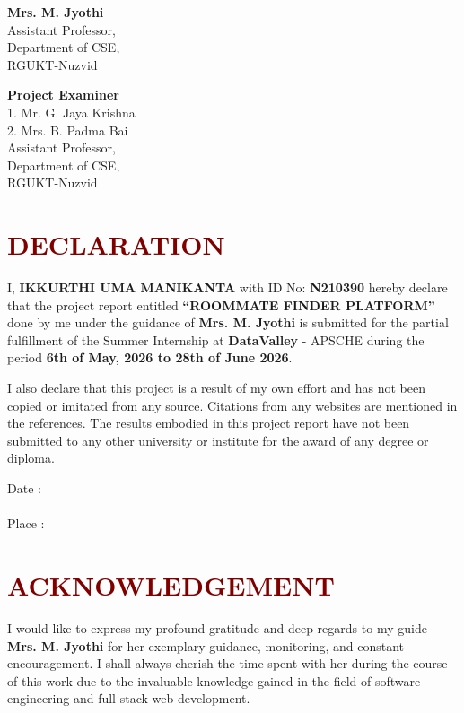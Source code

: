 \documentclass[12pt,a4paper]{report}
\begin{document}
\vspace{3cm}
\noindent
\begin{minipage}{0.5\textwidth}
\textbf{Mrs. M. Jyothi} \\
Assistant Professor, \\
Department of CSE, \\
RGUKT-Nuzvid
\end{minipage}%
\hfill
\begin{minipage}{0.45\textwidth}
\begin{flushright}
\textbf{Project Examiner} \\
1. Mr. G. Jaya Krishna \\
2. Mrs. B. Padma Bai \\
Assistant Professor, \\
Department of CSE, \\
RGUKT-Nuzvid
\end{flushright}
\end{minipage}
\newpage

\chapter*{\centering \Large \textcolor{maroon}{DECLARATION}}
\vspace{1cm}
I, \textbf{IKKURTHI UMA MANIKANTA} with ID No: \textbf{N210390} hereby declare that the project report entitled \textbf{``ROOMMATE FINDER PLATFORM''} done by me under the guidance of \textbf{Mrs. M. Jyothi} is submitted for the partial fulfillment of the Summer Internship at \textbf{DataValley} - APSCHE during the period \textbf{6th of May, 2026 to 28th of June 2026}.

I also declare that this project is a result of my own effort and has not been copied or imitated from any source. Citations from any websites are mentioned in the references. The results embodied in this project report have not been submitted to any other university or institute for the award of any degree or diploma.

\vspace{2cm}
\noindent Date : \hrulefill \\
\vspace{1cm} \\
\noindent Place : \hrulefill
\newpage

\chapter*{\centering \Large \textcolor{maroon}{ACKNOWLEDGEMENT}}
\vspace{1cm}
I would like to express my profound gratitude and deep regards to my guide \textbf{Mrs. M. Jyothi} for her exemplary guidance, monitoring, and constant encouragement. I shall always cherish the time spent with her during the course of this work due to the invaluable knowledge gained in the field of software engineering and full-stack web development.
\end{document}
